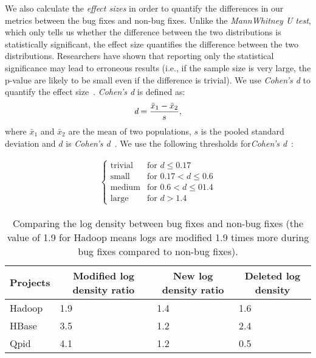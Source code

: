 We also calculate the {\em effect sizes} in order to quantify the differences in our metrics between the bug fixes and non-bug fixes. Unlike the {\em MannWhitney U test}, which only tells us whether the difference between the two distributions is statistically significant, the effect size quantifies the difference between the two distributions. Researchers have shown that reporting only the statistical significance may lead to erroneous results (i.e., if the sample size is very large, the p-value are likely to be small even if the difference is trivial). We use {\em Cohen's d} to quantify the effect size~\cite{cohenUsage1,cohenUsage2}. {\em Cohen's d} is defined as:
\begin{equation} \text{{\em d}} = \frac{\bar{x}_1 - \bar{x}_2}{s},
\label{eq:cohensd}
\end{equation}
where $\bar{x}_1$ and $\bar{x}_2$ are the mean of two populations, $s$ is the pooled standard deviation and $d$ is \emph{Cohen's d}~\cite{shadish2009combining}. We use the following thresholds for{\em Cohen's d}~\cite{Effectsize}:

 \begin{align}\label{cohens-d_interpretation-se}
\begin{cases}
\text{trivial}		& \text{for $d \le 0.17$}		\\
\text{small}		& \text{for $0.17 < d \le 0.6$}	\\
\text{medium}	& \text{for $0.6 < d \le 01.4$}	\\
\text{large}		& \text{for $d > 1.4$}
\end{cases}
\end{align}



\begin{table}[t]
	\protect\caption{Comparing the log density between bug fixes and non-bug fixes (the value of 1.9 for Hadoop means logs are modified 1.9 times more during bug fixes compared to non-bug fixes).}
	
	
	\begin{tabular}{|l|lll|}
		\hline 
		\multirow{1}{*}{Projects} & \multicolumn{1}{c}{Modified log density ratio} & \multicolumn{1}{c}{New log density ratio} & \multicolumn{1}{c|}{Deleted log density}\tabularnewline
		\hline 
		\multirow{1}{*}{Hadoop} & 1.9 & 1.4 & 1.6\tabularnewline
		\multirow{1}{*}{HBase} & 3.5 & 1.2 & 2.4\tabularnewline
		\multirow{1}{*}{Qpid} & 4.1 & 1.2 & 0.5\tabularnewline
		\hline 
	\end{tabular}
	\label{tba:logdensityNewLogs}
\end{table}


